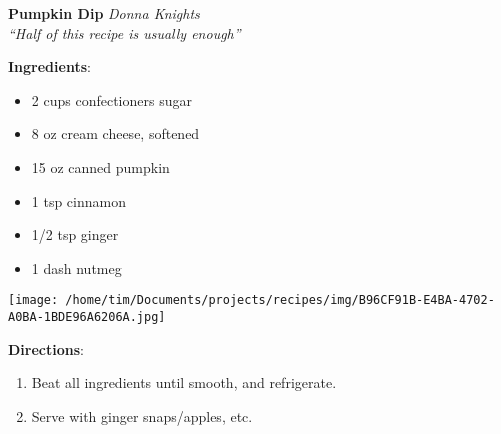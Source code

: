 \documentclass[11pt, twoside, openany]{book}
\begin{document}
\noindent\begin{minipage}[t]{\linewidth}%
{\Large\textbf{Pumpkin Dip}} \label{pumpkin-dip}\hfill\textit{Donna Knights}\\
\textit{``Half of this recipe is usually enough''}\\
\noindent\begin{minipage}[t]{0.78\linewidth}%
\textbf{Ingredients}:\vspace{-3mm}
\begin{multicols}{2}
\begin{itemize}\setlength\itemsep{-1mm}
\item 2 cups confectioners sugar
\item 8 oz cream cheese, softened
\item 15 oz canned pumpkin
\item 1 tsp cinnamon
\item 1/2 tsp ginger
\item 1 dash nutmeg
\end{itemize}
\end{multicols}
\end{minipage}
\noindent\begin{minipage}[t]{0.18\linewidth}
\centering \strut\vspace*{-\baselineskip}\newline
\texttt{[image: /home/tim/Documents/projects/recipes/img/B96CF91B-E4BA-4702-A0BA-1BDE96A6206A.jpg]}\\
\end{minipage}\vspace{3mm}
\textbf{Directions}:
\vspace{-3mm}\begin{enumerate}\setlength\itemsep{-1mm}
\item Beat all ingredients until smooth, and refrigerate.
\item Serve with ginger snaps/apples, etc.
\end{enumerate}
\end{minipage}\vspace{8mm}
\end{document}
